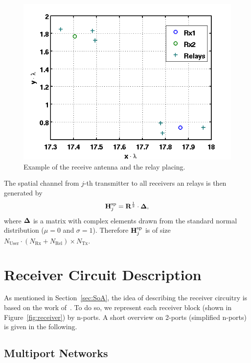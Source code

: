 \begin{figure}[h]
\begin{center}
\includegraphics[width=\textwidth]{images/antennae_position.png}
\caption{Example of the receive antenna and the relay placing.}
\label{fig:antenna_placing}
\end{center}
\end{figure}

The spatial channel from $j$-th transmitter to all receivers an relays is then generated by
\begin{equation}
\label{eq:spatial_channel}
\mathbf{H}_{j}^{\text{sp}} = \mathbf{R}^{\frac{1}{2}}\cdot\mathbf{\Delta},
\end{equation} 
where $\mathbf{\Delta}$ is a matrix with complex elements drawn from the standard normal distribution ($\mu = 0$ and $\sigma = 1$).
Therefore $\mathbf{H}_{j}^{\text{sp}}$ is of size $N_{\text{User}}\cdot \left(N_\text{Rx} + N_\text{Rel}\right) \times N_\text{Tx}$.


\section{Receiver Circuit Description}
\label{sec:network_description}
As mentioned in Section~\ref{sec:SoA}, the idea of describing the receiver circuitry is based on the work of~\cite{Nossek}.
To do so, we represent each receiver block (shown in Figure~\ref{fig:receiver}) by n-ports.
A short overview on 2-ports (simplified n-ports) is given in the following.

\subsection{Multiport Networks}
\label{sec:multiport_networks}

